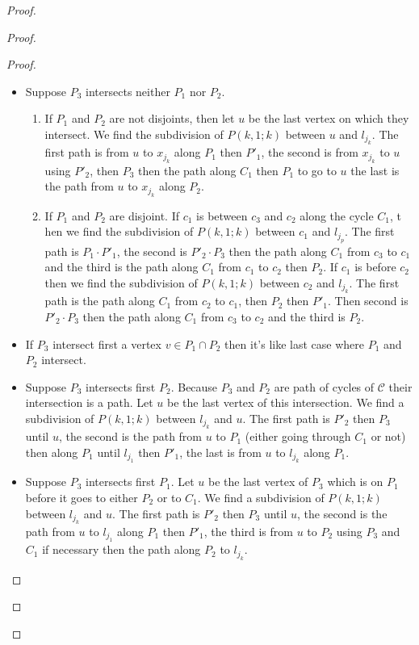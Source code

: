 \documentclass[utf8,10pt]{article}
\theoremstyle{plain}
\theoremstyle{definition}
\theoremstyle{remark}
\begin{document}
\begin{proof}
\begin{proof}
\begin{proof}
\begin{itemize}
	\item Suppose $P_3$ intersects neither $P_1$ nor $P_2$.
	\begin{enumerate}
		\item If $P_1$ and $P_2 $ are not disjoints,
		then let $u$ be the last vertex on which they intersect. We find the subdivision of $P(k,1;k)$ between $u$ and $l_{j_k}$.
		The first path is from $u$ to $x_{j_k}$ along $P_1$ then $P'_1$, the second is from $x_{j_k}$
		to $u$ using $P'_2$, then $P_3$ then the path along $C_1$
		then $P_1$ to go to $u$ the last is the path from $u$ to $x_{j_k}$ along $P_2$.
		\item 	If $P_1$ and $P_2$ are disjoint. If $c_1$ is between $c_3$ and $c_2$ along the cycle $C_1$, t
		hen we find the subdivision of $P(k,1;k)$
		between $c_1$ and $l_{j_p}$. The first path is $P_1 \cdot P'_1$, the second is $P'_2 \cdot P_3$
		then the path along $C_1$ from $c_3$ to $c_1$ and the third
		is the path along $C_1$ from $c_1$ to $c_2$ then $P_2$. If $c_1$ is before
		 $c_2$ then we find the subdivision of $P(k,1;k)$ between $c_2$ and
		$l_{j_k} $. The first path is the path along $C_1$ from $c_2$ to $c_1$, then $P_2$ then $P'_1$.
		Then second is $P'_2 \cdot P_3$ then the path along $C_1$ from
		$c_3$ to $c_2$ and the third is $P_2$.
\end{enumerate}
	\item If $P_3$ intersect first a vertex $v \in P_1 \cap P_2$ then it's like last case where $P_1$ and $P_2$ intersect.
	\item Suppose $P_3$ intersects first $P_2$. Because $P_3$ and $P_2$ are path of cycles of $\mathcal{C}$
	their intersection is a path. Let $u$ be the last vertex of this intersection.
	We find a subdivision of $P(k,1;k)$ between $l_{j_k}$ and $u$.
	The first path is $P'_2$ then $P_3$ until $u$, the second is the path from $u$ to $P_1$ (either going
	through $C_1$ or not) then along $P_1$ until $l_{j_1}$ then $P'_1$, the last is from $u$ to $l_{j_k}$ along $P_1$.
	\item Suppose $P_3$ intersects first $P_1$. Let $u$ be the last vertex of $P_3$ which
	 is on $P_1$ before it goes to either $P_2$ or to $C_1$.
	We find a subdivision of $P(k,1;k)$ between $l_{j_k}$ and $u$. The first path is $P'_2$ then
	$P_3$ until $u$, the second is the path from $u$ to	$l_{j_1}$ along $P_1$ then $P'_1$,
	the third is from $u$ to $P_2$ using $P_3$ and $C_1$ if necessary then the path along $P_2$ to  $l_{j_k}$.
\end{itemize}



\end{proof}
\end{proof}
\end{proof}
\end{document}
